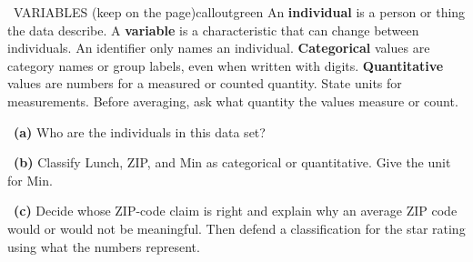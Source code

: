 \documentclass[11pt]{article}
\begin{document}
\begin{callout}{\IconBook\ VARIABLES (keep on the page)}{calloutgreen}
An \textbf{individual} is a person or thing the data describe. A \textbf{variable} is a characteristic that can change between individuals. An identifier only names an individual. \textbf{Categorical} values are category names or group labels, even when written with digits. \textbf{Quantitative} values are numbers for a measured or counted quantity. State units for measurements. Before averaging, ask what quantity the values measure or count.
\end{callout}

~\textbf{(a)} Who are the individuals in this data set?\par
{}

~\textbf{(b)} Classify Lunch, ZIP, and Min as categorical or quantitative. Give the unit for Min.\par
{}

~\textbf{(c)} Decide whose ZIP-code claim is right and explain why an average ZIP code would or would not be meaningful. Then defend a classification for the star rating using what the numbers represent.\par
{}
\end{document}
